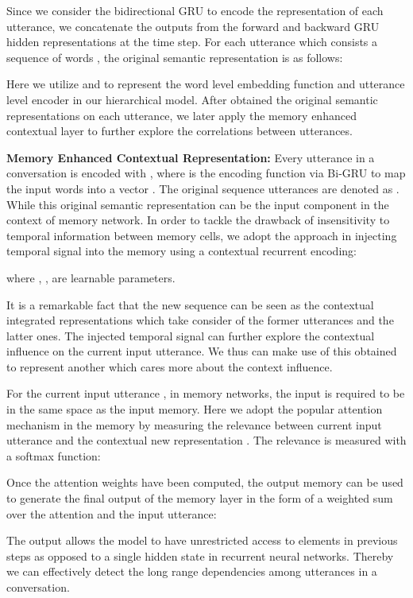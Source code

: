 \documentclass[sigconf]{acmart}
\begin{document}
Since we consider the bidirectional GRU to encode the representation of each utterance, we concatenate the outputs from the forward and backward GRU hidden representations at the time step. For each utterance  which consists a sequence of words , the original semantic representation is as follows:
   

Here we utilize  and  to represent the word level embedding function and utterance level encoder in our hierarchical model. After obtained the original semantic representations on each utterance, we later apply the memory enhanced contextual layer to further explore the correlations between utterances. 

\noindent \textbf{Memory Enhanced Contextual Representation: } Every utterance in a conversation is encoded with , where  is the encoding function via Bi-GRU to map the input words into a vector . The original sequence utterances are denoted as . While this original semantic representation can be the input component in the context of memory network. In order to tackle the drawback of insensitivity to temporal information between memory cells, we adopt the approach in injecting temporal signal into the memory using a contextual recurrent encoding:
 
where , ,  are learnable parameters.

It is a remarkable fact that the new sequence  can be seen as the contextual integrated representations which take consider of the former utterances and the latter ones. The injected temporal signal can further explore the contextual influence on the current input utterance. We thus can make use of this obtained  to represent another  which cares more about the context influence.

For the current input utterance , in memory networks, the input is required to be in the same space as the input memory. Here we adopt the popular attention mechanism in the memory by measuring the relevance between current input utterance  and the contextual new representation . The relevance is measured with a softmax function:


Once the attention weights have been computed, the output memory can be used to generate the final output of the memory layer in the form of a weighted sum over the attention and the input utterance:


The output allows the model to have unrestricted access to elements in previous steps as opposed to a single hidden state  in recurrent neural networks. Thereby we can effectively detect the long range dependencies among utterances in a conversation.
\end{document}
